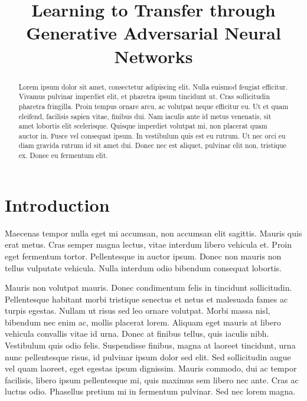 \documentclass[aoas,preprint,authoryear]{imsart}
\begin{document}
\begin{frontmatter}
\title{Learning to Transfer through\\
       Generative Adversarial Neural Networks}


\author{ }

\begin{abstract}

Lorem ipsum dolor sit amet, consectetur adipiscing elit. Nulla euismod feugiat
efficitur. Vivamus pulvinar imperdiet elit, et pharetra ipsum tincidunt ut. Cras
sollicitudin pharetra fringilla. Proin tempus ornare arcu, ac volutpat neque
efficitur eu. Ut et quam eleifend, facilisis sapien vitae, finibus dui. Nam
iaculis ante id metus venenatis, sit amet lobortis elit scelerisque. Quisque
imperdiet volutpat mi, non placerat quam auctor in. Fusce vel consequat ipsum.
In vestibulum quis est eu rutrum. Ut nec orci eu diam gravida rutrum id sit amet
dui. Donec nec est aliquet, pulvinar elit non, tristique ex. Donec eu fermentum
elit.

\end{abstract}

\end{frontmatter}

\section{Introduction}

Maecenas tempor nulla eget mi accumsan, non accumsan elit sagittis. Mauris quis
erat metus. Cras semper magna lectus, vitae interdum libero vehicula et. Proin
eget fermentum tortor. Pellentesque in auctor ipsum. Donec non mauris non tellus
vulputate vehicula. Nulla interdum odio bibendum consequat lobortis.

Mauris non volutpat mauris. Donec condimentum felis in tincidunt sollicitudin.
Pellentesque habitant morbi tristique senectus et netus et malesuada fames ac
turpis egestas. Nullam ut risus sed leo ornare volutpat. Morbi massa nisl,
bibendum nec enim ac, mollis placerat lorem. Aliquam eget mauris at libero
vehicula convallis vitae id urna. Donec at finibus tellus, quis iaculis nibh.
Vestibulum quis odio felis. Suspendisse finibus, magna at laoreet tincidunt,
urna nunc pellentesque risus, id pulvinar ipsum dolor sed elit. Sed sollicitudin
augue vel quam laoreet, eget egestas ipsum dignissim. Mauris commodo, dui ac
tempor facilisis, libero ipsum pellentesque mi, quis maximus sem libero nec
ante. Cras ac luctus odio. Phasellus pretium mi in fermentum pulvinar. Sed nec
lorem magna.
\end{document}

